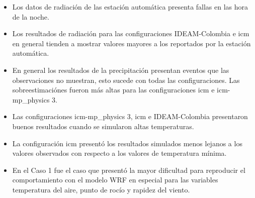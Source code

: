 \begin{itemize}

    \item Los datos de radiación de las estación automática presenta fallas en las hora de la noche.
    
    \item Los resultados de radiación para las configuraciones IDEAM-Colombia e icm en general tienden a mostrar valores mayores a los reportados por la estación automática.
    
    \item En general los resultados de la precipitación presentan eventos que las observaciones no muestran, esto sucede con todas las configuraciones. Las sobreestimaciónes fueron más altas para las configuraciones icm e icm-mp\_physics 3.
    
    \item Las configuraciones icm-mp\_physics 3, icm e IDEAM-Colombia presentaron buenos resultados cuando se simularon altas temperaturas.
    
    \item La configuración icm presentó los resultados simulados menos lejanos a los valores observados con respecto a los valores de temperatura mínima. 
    
    \item En el Caso 1 fue el caso que presentó la mayor dificultad para reproducir el comportamiento con el modelo WRF en especial para las variables temperatura del aire, punto de rocío y rapidez del viento.
\end{itemize}
